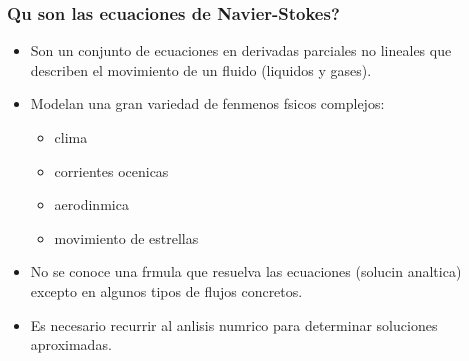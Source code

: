 \documentclass[serif,9pt]{beamer}
\begin{document}
\begin{frame}\frametitle{Qu son las ecuaciones de Navier-Stokes?} 

\begin{itemize}

\item Son un conjunto de ecuaciones en derivadas parciales no lineales  que describen el movimiento de un fluido (liquidos y gases). \pause
\bigskip


\item Modelan una gran variedad de fenmenos fsicos complejos: \medskip
\begin{itemize}
 \item clima \pause \medskip
 \item corrientes ocenicas  \pause \medskip
 \item aerodinmica \pause \medskip
 \item movimiento de estrellas 
\end{itemize} \pause
\bigskip

\item No se conoce una frmula que resuelva las ecuaciones (solucin analtica) excepto en algunos tipos de flujos concretos.
\pause
\bigskip

\item Es necesario recurrir al anlisis numrico para determinar soluciones aproximadas.
\bigskip

\end{itemize}

\end{frame}
\end{document}
